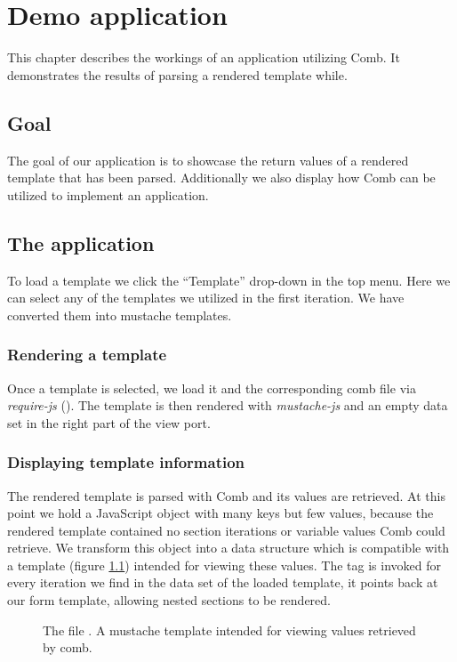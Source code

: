 \chapter{Demo application}
\label{chap:demo}
This chapter describes the workings of an application utilizing Comb.
It demonstrates the results of parsing a rendered template while.

\section{Goal}
The goal of our application is to showcase the return values of a
rendered template that has been parsed.
Additionally we also display how Comb can be utilized to implement an
application.

\section{The application}
To load a template we click the ``Template'' drop-down in the top menu.
Here we can select any of the templates we utilized in the first iteration.
We have converted them into mustache templates.

\subsection{Rendering a template}
Once a template is selected, we load it and the corresponding comb file via
\emph{require-js} (). The template is then rendered with
\emph{mustache-js} and an empty data set in the right part of the view port.

\subsection{Displaying template information}
The rendered template is parsed with Comb and its values are retrieved.
At this point we hold a JavaScript object with many keys but few values,
because the rendered template contained no section iterations or variable values
Comb could retrieve. We transform this object into a data structure which is
compatible with a template (figure \ref{fig:mustache.mustache}) intended for
viewing these values. The  tag is invoked for every
iteration we find in the data set of the loaded template, it points back at our
form template, allowing nested sections to be rendered.

\begin{figure}
	\centering
	\caption{
		The file .
		A mustache template intended for viewing values retrieved by comb.}
	\label{fig:mustache.mustache}
	
\end{figure}

